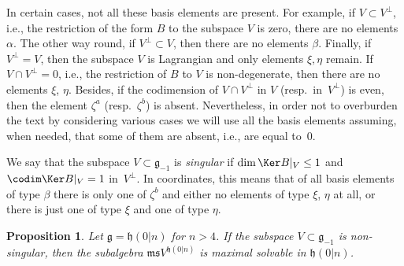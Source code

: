 \documentclass[10pt,a4paper]{amsart}
\newcommand {\fg} {{\mathfrak{g}}} %
\newcommand {\fh} {{\mathfrak{h}}}
\newcommand {\fm} {{\mathfrak{m}}}
\newcommand {\fs} {{\mathfrak{s}}}
\newcommand {\<} [2] {{\left.\vphantom{#2}\right.^{#1\!}\!{#2}}}
\numberwithin{equation}{section}
\newtheorem{Proposition}[Theorem]{Proposition}
\begin{document}
In certain cases, not all these basis elements are present. For example, if $V\subset V^\perp$, i.e., the restriction of the form $B$ to the subspace $V$ is zero, there are no elements $\alpha$. The other way round, if $V^\perp\subset V$, then there are no elements $\beta$. Finally, if $V^\perp=V$, then the subspace $V$ is Lagrangian and only elements $\xi, \eta$ remain. If $V\cap V^\perp=0$, i.e., the restriction of $B$ to $V$ is non-degenerate, then there are no elements $\xi$, $\eta$.
Besides, if the codimension of $V\cap V^\perp$ in $V$ (resp.\ in~$V^\perp$) is even, then the element $\zeta^a$ (resp.\ $\zeta^b$) is absent. Nevertheless, in order not to overburden the text by considering various cases we will use all the basis elements assuming, when needed, that some of them are absent, i.e., are equal to~0.

We say that the subspace $V\subset \fg_{-1}$ is \textit{singular} if $\dim \Ker B|_V\leq 1$ and $\codim \Ker B|_V=1$ in~$V^\perp$.
In coordinates, this means that of all basis elements of type $\beta$ there is only one of $\zeta^b$ and either no elements of type $\xi$, $\eta$ at all, or there is just one of type $\xi$ and one of type $\eta$.


\begin{Proposition}\label{ThH} Let $\fg=\fh(0|n)$ for $n>4$. If the subspace $V\subset \fg_{-1}$ is non-singular, then the subalgebra $\fm\fs V^{\fh(0|n)}$ is maximal solvable in $\fh(0|n)$.
\end{Proposition}
\end{document}
